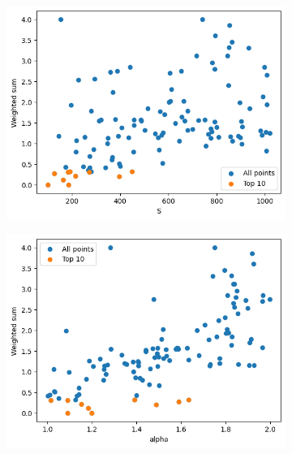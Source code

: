 \begin{frame}
\begin{figure}

        \hfill
        \begin{subfigure}{0.45\textwidth}
            \includegraphics[width=\textwidth]{../images/report/w221-S.png}
        \end{subfigure}
        \hfill
        \begin{subfigure}{0.45\textwidth}
            \includegraphics[width=\textwidth]{../images/report/w221-alpha.png}
        \end{subfigure}
        \hfill
    \end{figure}
\end{frame}


